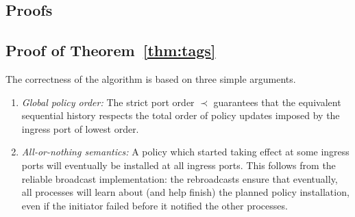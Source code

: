\documentclass[11pt,pdftex,letter]{article}
\newcommand{\eg}{{\it e.g.}}
\newcommand{\ssnote}[1]{\textcolor{heraldBlue}{\small \bf [SS: #1]}}
\newcommand{\ssnote}[1]{}
\begin{document}
\begin{appendix}

\section{Proofs}


\subsection{Proof of Theorem~\ref{thm:tags}}

The correctness of the algorithm is based on three simple arguments.

\begin{enumerate}
\item \emph{Global policy order:} The strict port order $\prec$
  guarantees that the equivalent sequential
history respects the total order of policy updates imposed by the ingress port of
lowest order. 

\item \emph{All-or-nothing semantics:} A policy which started taking effect at some ingress ports will eventually 
be installed at all ingress ports. This follows from the reliable broadcast implementation: the rebroadcasts ensure
that eventually, all processes will learn about (and help finish) the planned policy installation, even if the initiator failed before it
notified the other processes. 


\end{enumerate}
\end{appendix}
\end{document}

